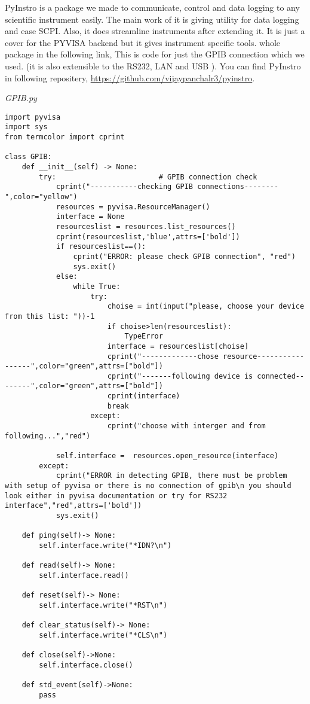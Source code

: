 
PyInstro is a package we made to communicate, control and data logging to any scientific instrument easily. The main work of it is giving utility for data logging and ease SCPI. Also, it does streamline instruments after extending it. It is just a cover for the PYVISA backend but it gives instrument specific tools. whole package in the following link,
This is code for just the GPIB connection which we used. (it is also extensible to the RS232, LAN and USB ). You can find PyInstro in following repositery, \href{https://github.com/vijaypanchalr3/pyinstro}{https://github.com/vijaypanchalr3/pyinstro}. 


\emph{GPIB.py}
\begin{verbatim}
import pyvisa
import sys
from termcolor import cprint

class GPIB:
    def __init__(self) -> None:                                 
        try:                        # GPIB connection check
            cprint("-----------checking GPIB connections--------",color="yellow")
            resources = pyvisa.ResourceManager()
            interface = None
            resourceslist = resources.list_resources()
            cprint(resourceslist,'blue',attrs=['bold'])
            if resourceslist==():
                cprint("ERROR: please check GPIB connection", "red")
                sys.exit()
            else:
                while True:
                    try:
                        choise = int(input("please, choose your device from this list: "))-1
                        if choise>len(resourceslist):
                            TypeError
                        interface = resourceslist[choise]
                        cprint("-------------chose resource-----------------",color="green",attrs=["bold"])
                        cprint("-------following device is connected--------",color="green",attrs=["bold"])
                        cprint(interface)
                        break
                    except:
                        cprint("choose with interger and from following...","red")

            self.interface =  resources.open_resource(interface)
        except:
            cprint("ERROR in detecting GPIB, there must be problem with setup of pyvisa or there is no connection of gpib\n you should look either in pyvisa documentation or try for RS232 interface","red",attrs=['bold'])
            sys.exit()

    def ping(self)-> None:
        self.interface.write("*IDN?\n")

    def read(self)-> None:
        self.interface.read()

    def reset(self)-> None:
        self.interface.write("*RST\n")

    def clear_status(self)-> None:
        self.interface.write("*CLS\n")

    def close(self)->None:
        self.interface.close()

    def std_event(self)->None:
        pass

\end{verbatim}


